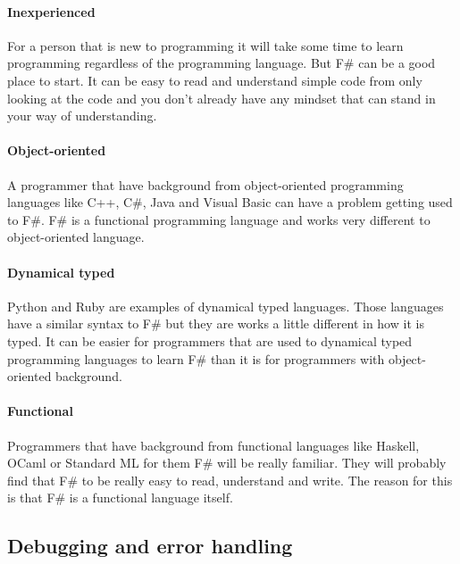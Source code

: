 \documentclass[12pt, a4paper]{article}
\newcommand*\quotefont{\fontfamily{LinuxLibertineT-LF}} %
\newcommand*\quotesize{60} %
\newcommand*{\openquote}
   {\tikz[remember picture,overlay,xshift=-4ex,yshift=-2.5ex]
   \node (OQ) {\quotefont\fontsize{\quotesize}{\quotesize}\selectfont``};\kern0pt}
\newcommand*{\closequote}[1]
  {\tikz[remember picture,overlay,xshift=4ex,yshift={#1}]
   \node (CQ) {\quotefont\fontsize{\quotesize}{\quotesize}\selectfont''};}
\newcommand*\shadedauthorformat{\emph} %
\newcommand*\authoralign[1]{
 	\def\authorfill{\hfill}\def\quotefill{}
}
\newenvironment{shadequote}[2][l]%
{\authoralign{#1}
\ifblank{#2}
   {\def\shadequoteauthor{}\def\yshift{-2ex}\def\quotefill{\hfill}}
   {\def\shadequoteauthor{\par\authorfill\shadedauthorformat{#2}}\def\yshift{2ex}}
\begin{snugshade}\begin{quote}\openquote}
{\shadequoteauthor\quotefill\closequote{\yshift}\end{quote}\end{snugshade}}
\begin{document}
\paragraph{Inexperienced}
For a person that is new to programming it will take some time to learn programming regardless of the programming language. But F\# can be a good place to start. It can be easy to read and understand simple code from only looking at the code and you don't already have any mindset that can stand in your way of understanding.

\paragraph{Object-oriented}
A programmer that have background from object-oriented programming languages like C++, C\#, Java and Visual Basic can have a problem getting used to F\#. F\# is a functional programming language and works very different to object-oriented language.


\paragraph{Dynamical typed}
Python and Ruby are examples of dynamical typed languages. Those languages have a similar syntax to F\# but they are works a little different in how it is typed. It can be easier for programmers that are used to dynamical typed programming languages to learn F\# than it is for programmers with object-oriented background.  


\paragraph{Functional}
Programmers that have background from functional languages like Haskell, OCaml or Standard ML for them F\# will be really familiar. They will probably find that F\# to be really easy to read, understand and write. The reason for this is that F\# is a functional language itself. 

\newpage
\subsection{Debugging and error handling}
\label{debug}
\end{document}
